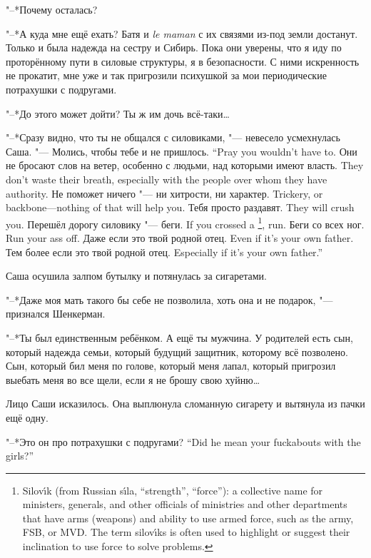 "--*Почему осталась?

"--*А куда мне ещё ехать?
Батя и \textit{le maman} с их связями из-под земли достанут.
Только и была надежда на сестру и Сибирь.
Пока они уверены, что я иду по проторённому пути в силовые структуры, я в безопасности.
С ними искренность не прокатит, мне уже и так пригрозили психушкой за мои периодические потрахушки с подругами.

"--*До этого может дойти?
Ты ж им дочь всё-таки\dots{}

"--*Сразу видно, что ты не общался с силовиками, "--- невесело усмехнулась Саша.
{"--- Молись, чтобы тебе и не пришлось.}
{``Pray you wouldn't have to.}
{Они не бросают слов на ветер, особенно с людьми, над которыми имеют власть.}
{They don't waste their breath, especially with the people over whom they have authority.}
{Не поможет ничего "--- ни хитрости, ни характер.}
{Trickery, or backbone---nothing of that will help you.}
{Тебя просто раздавят.}
{They will crush you.}
{Перешёл дорогу силовику "--- беги.}
{If you crossed a \silovik\footnote{Silov\'{\i}k (from Russian s\'{\i}la, ``strength'', ``force''): a collective name for ministers, generals, and other officials of ministries and other departments that have arms (weapons) and ability to use armed force, such as the army, FSB, or MVD. The term silov\'{\i}ks is often used to highlight or suggest their inclination to use force to solve problems.}, run.}
{Беги со всех ног.}
{Run your ass off.}
{Даже если это твой родной отец.}
{Even if it's your own father.}
{Тем более если это твой родной отец.}
{Especially if it's your own father.''}

Саша осушила залпом бутылку и потянулась за сигаретами.

"--*Даже моя мать такого бы себе не позволила, хоть она и не подарок, "--- признался Шенкерман.

"--*Ты был единственным ребёнком.
А ещё ты мужчина.
У родителей есть сын, который надежда семьи, который будущий защитник, которому всё позволено.
Сын, который бил меня по голове, который меня лапал, который пригрозил выебать меня во все щели, если я не брошу свою хуйню\dots{}

Лицо Саши исказилось.
Она выплюнула сломанную сигарету и вытянула из пачки ещё одну.

{"--*Это он про потрахушки с подругами?}
{``Did he mean your fuckabouts with the girls?''}

